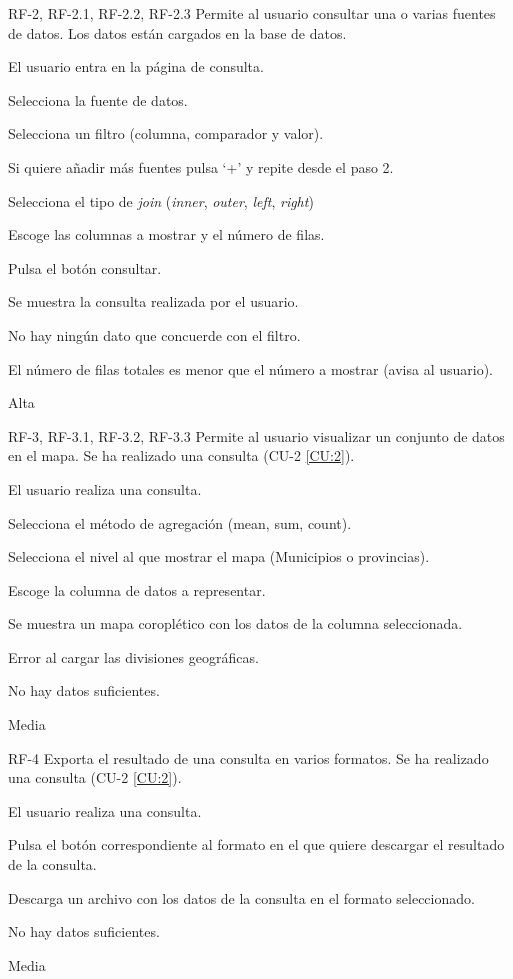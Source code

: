 
{RF-2, RF-2.1, RF-2.2, RF-2.3}
{Permite al usuario consultar una o varias fuentes de datos.}
{Los datos están cargados en la base de datos.}
{
	\item El usuario entra en la página de consulta.
	\item Selecciona la fuente de datos.
	\item Selecciona un filtro (columna, comparador y valor).
	\item Si quiere añadir más fuentes pulsa `+' y repite desde el paso 2.
	\item Selecciona el tipo de \textit{join} (\textit{inner}, \textit{outer}, \textit{left}, \textit{right})
	\item Escoge las columnas a mostrar y el número de filas.
	\item Pulsa el botón consultar.
}
{Se muestra la consulta realizada por el usuario.}
{
	\item No hay ningún dato que concuerde con el filtro.
	\item El número de filas totales es menor que el número a mostrar (avisa al usuario).
}
{Alta}


{RF-3, RF-3.1, RF-3.2, RF-3.3}
{Permite al usuario visualizar un conjunto de datos en el mapa.}
{Se ha realizado una consulta (CU-2 \ref{CU:2}).}
{
	\item El usuario realiza una consulta.
	\item Selecciona el método de agregación (mean, sum, count).
	\item Selecciona el nivel al que mostrar el mapa (Municipios o provincias).
	\item Escoge la columna de datos a representar.
}
{Se muestra un mapa coroplético con los datos de la columna seleccionada.}
{
	\item Error al cargar las divisiones geográficas.
	\item No hay datos suficientes.
}
{Media}


{RF-4}
{Exporta el resultado de una consulta en varios formatos.}
{Se ha realizado una consulta (CU-2 \ref{CU:2}).}
{
	\item El usuario realiza una consulta.
	\item Pulsa el botón correspondiente al formato en el que quiere descargar el resultado de la consulta.
}
{Descarga un archivo con los datos de la consulta en el formato seleccionado.}
{
	\item No hay datos suficientes.
}
{Media}

